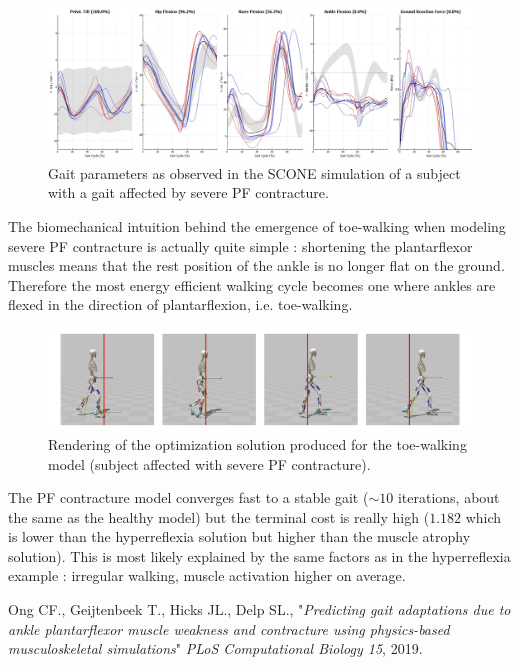 \documentclass[11pt]{article}
\begin{document}
\begin{figure}[h!]
    \centering
    \includegraphics[width=\textwidth]{screens/toe_walk_gait.png}
    \caption{Gait parameters as observed in the SCONE simulation of a subject with a gait affected by severe PF contracture.}
    \label{toe_gait}
\end{figure}

The biomechanical intuition behind the emergence of toe-walking when modeling severe PF contracture is actually quite simple : shortening the plantarflexor muscles means that the rest position of the ankle is no longer flat on the ground. Therefore the most energy efficient walking cycle becomes one where ankles are flexed in the direction of plantarflexion, i.e. toe-walking.

\begin{figure}[h!]
    \centering
    \includegraphics[width=\textwidth]{screens/toe_render.jpg}
    \caption{Rendering of the optimization solution produced for the toe-walking model (subject affected with severe PF contracture).}
    \label{toe_render}
\end{figure}

The PF contracture model converges fast to a stable gait ($\sim 10$ iterations, about the same as the healthy model) but the terminal cost is really high ($1.182$ which is lower than the hyperreflexia solution but higher than the muscle atrophy solution). This is most likely explained by the same factors as in the hyperreflexia example : irregular walking, muscle activation higher on average.


\begin{thebibliography}{1}

     Ong CF., Geijtenbeek T., Hicks JL., Delp SL., "\textit{Predicting gait adaptations due to ankle plantarflexor muscle weakness and contracture using physics-based musculoskeletal simulations}" \emph{PLoS Computational Biology 15}, 2019.
\end{thebibliography}
\end{document}
